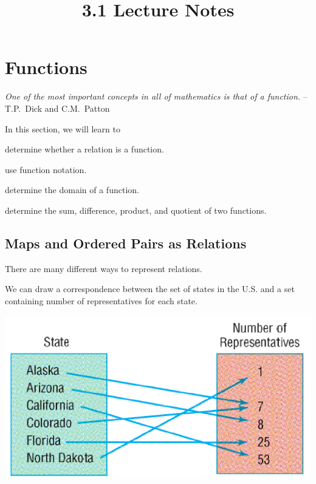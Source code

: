 \documentclass[oneside,10pt]{book}
\title{3.1 Lecture Notes}
\begin{document}

\section{Functions}

\textit{One of the most important concepts in all of mathematics is that of
  a function.} --T.P.~Dick and C.M.~Patton\\



\begin{objectives}{In this section, we will learn to}
  \item
    determine whether a relation is a function.
  \item
    use function notation.
  \item
    determine the domain of a function.
  \item
    determine the sum, difference, product, and quotient of two functions.
\end{objectives}





\subsection{Maps and Ordered Pairs as Relations}
There are many different ways to represent relations.

\example
We can draw a correspondence between the set of states in the U.S. and a set
containing number of representatives for each state.

\begin{center}
  \includegraphics[scale=0.8]{Picture1.png}
\end{center}
\end{document}
